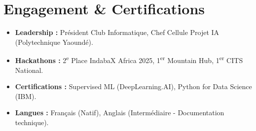 \documentclass[a4paper,11pt]{article}
\begin{document}
\section{Engagement \& Certifications}
\begin{itemize}[leftmargin=*, nosep]
    \item \textbf{Leadership :} Président Club Informatique, Chef Cellule Projet IA (Polytechnique Yaoundé).
    \item \textbf{Hackathons :} 2\textsuperscript{e} Place IndabaX Africa 2025, 1\textsuperscript{er} Mountain Hub, 1\textsuperscript{er} CITS National.
    \item \textbf{Certifications :} Supervised ML (DeepLearning.AI), Python for Data Science (IBM).
    \item \textbf{Langues :} Français (Natif), Anglais (Intermédiaire - Documentation technique).
\end{itemize}
\end{document}
